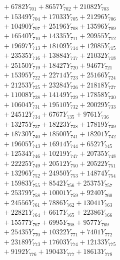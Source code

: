 \documentclass[a4paper,10pt]{article}
\begin{document}
{\begin{align}
&\;  + 6782 Y_{701} + 8657 Y_{702} + 21082 Y_{703} \\[0.3ex]
&\;  + 15349 Y_{704} + 17033 Y_{705} + 21296 Y_{706} \\[0.3ex]
&\;  + 10490 Y_{707} + 25196 Y_{708} + 13596 Y_{709} \\[0.3ex]
&\;  + 16540 Y_{710} + 14335 Y_{711} + 20955 Y_{712} \\[0.3ex]
&\;  + 19697 Y_{713} + 18109 Y_{714} + 12085 Y_{715} \\[0.3ex]
&\;  + 23535 Y_{716} + 13884 Y_{717} + 21032 Y_{718} \\[0.5ex]\allowbreak
&\;  + 25150 Y_{719} + 18427 Y_{720} + 9467 Y_{721} \\[0.3ex]
&\;  + 15395 Y_{722} + 22714 Y_{723} + 25166 Y_{724} \\[0.3ex]
&\;  + 21253 Y_{725} + 23284 Y_{726} + 21818 Y_{727} \\[0.3ex]
&\;  + 11008 Y_{728} + 14149 Y_{729} + 17858 Y_{730} \\[0.3ex]
&\;  + 10604 Y_{731} + 19510 Y_{732} + 20029 Y_{733} \\[0.3ex]
&\;  + 24512 Y_{734} + 6767 Y_{735} + 9761 Y_{736} \\[0.3ex]
&\;  + 13275 Y_{737} + 18223 Y_{738} + 17819 Y_{739} \\[0.3ex]
&\;  + 18730 Y_{740} + 18500 Y_{741} + 18201 Y_{742} \\[0.3ex]
&\;  + 19605 Y_{743} + 16914 Y_{744} + 6527 Y_{745} \\[0.3ex]
&\;  + 12534 Y_{746} + 10219 Y_{747} + 20735 Y_{748} \\[0.5ex]\allowbreak
&\;  + 22225 Y_{749} + 20512 Y_{750} + 20522 Y_{751} \\[0.3ex]
&\;  + 13296 Y_{752} + 24950 Y_{753} + 14874 Y_{754} \\[0.3ex]
&\;  + 15983 Y_{755} + 8542 Y_{756} + 25375 Y_{757} \\[0.3ex]
&\;  + 25379 Y_{758} + 10001 Y_{759} + 9240 Y_{760} \\[0.3ex]
&\;  + 24556 Y_{761} + 7886 Y_{762} + 13041 Y_{763} \\[0.3ex]
&\;  + 22821 Y_{764} + 6617 Y_{765} + 22386 Y_{766} \\[0.3ex]
&\;  + 15577 Y_{767} + 6995 Y_{768} + 9577 Y_{769} \\[0.3ex]
&\;  + 25435 Y_{770} + 10322 Y_{771} + 7401 Y_{772} \\[0.3ex]
&\;  + 23189 Y_{773} + 17603 Y_{774} + 12133 Y_{775} \\[0.3ex]
&\;  + 9192 Y_{776} + 19043 Y_{777} + 18613 Y_{778} \\[0.5ex]\allowbreak

\end{align}}
\end{document}
